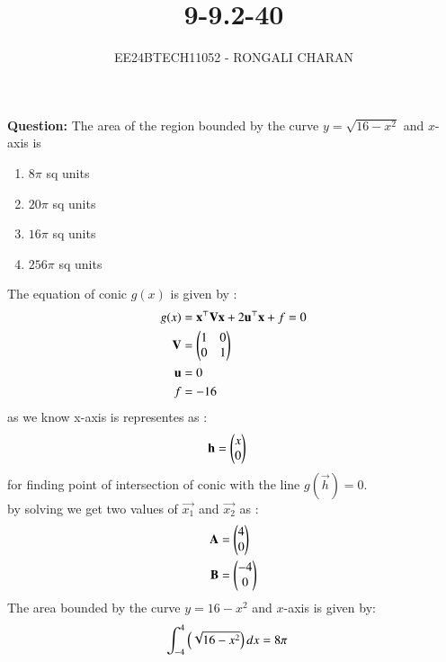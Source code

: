 \documentclass[journal,12pt,onecolumn]{IEEEtran}
\theoremstyle{remark}
\begin{document}

\vspace{3cm}
\title{9-9.2-40}
\author{EE24BTECH11052 - RONGALI CHARAN}
{\let\newpage\relax\maketitle}

\renewcommand{\thefigure}{\theenumi}
\renewcommand{\thetable}{\theenumi}
\setlength{\intextsep}{10pt} %


\renewcommand{\thetable}{\theenumi}
\textbf{Question:} The area of the region bounded by the curve $y=\sqrt{16-x^2}$ and $x$-axis is
\begin{enumerate}
\item $8\pi$ sq units
\item $20\pi$ sq units
\item $16\pi$ sq units
\item $256\pi$ sq units
\end{enumerate}
\solution
The equation of conic $g(x)$ is given by :
\begin{align}
	g(x) &= \mathbf{x}^\top \mathbf{V}\mathbf{x}+2\mathbf{u}^\top \mathbf{x}+f=0\\
	\mathbf{V} &= \begin{pmatrix}1 & 0\\0 & 1\end{pmatrix}\\
	\mathbf{u} &= 0 \\
	f &= -16
       \end{align}
       as we know x-axis is representes as :
\begin{align}
	\mathbf{h} &= \begin{pmatrix}x \\ 0\end{pmatrix}
\end{align}
for finding point of intersection of conic with the line $g(\vec{h})=0$.\\
by solving we get two values of $\vec{x_1}$ and $\vec{x_2}$ as :
\begin{align}
	\mathbf{A} &= \begin{pmatrix}4 \\0\end{pmatrix}\\
	\mathbf{B} &= \begin{pmatrix}-4\\0\end{pmatrix}
\end{align}
The area bounded by the curve $y = 16-x^2$ and $x$-axis is given by:
\begin{align}
	\int_{-4}^{4}\left(\sqrt{16-x^2} \right)dx &= 8\pi 
\end{align}
\end{document}
